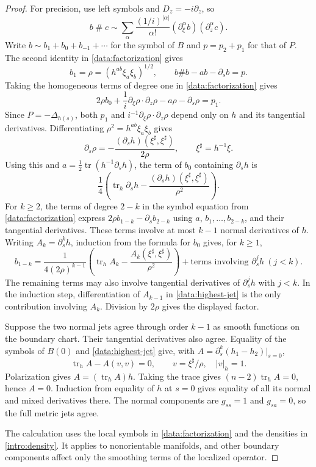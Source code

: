 \documentclass[11pt,a4paper]{article}
\theoremstyle{definition}
\theoremstyle{remark}
\DeclareMathOperator{\tr}{tr}
\numberwithin{equation}{section}
\begin{document}
\begin{proof}
For precision, use left symbols and $D_z=-i\partial_z$, so
\[
 b\mathbin{\#}c\sim
 \sum_\alpha\frac{(1/i)^{|\alpha|}}{\alpha!}
       (\partial_\xi^\alpha b)(\partial_z^\alpha c).
\]
Write $b\sim b_1+b_0+b_{-1}+\cdots$ for the symbol of $B$ and
$p=p_2+p_1$ for that of $P$. The second identity in
\eqref{data:factorization} gives
\[
 b_1=\rho=(h^{ab}\xi_a\xi_b)^{1/2},\qquad
 b\#b-ab-\partial_sb=p.
\]
Taking the homogeneous terms of degree one in
\eqref{data:factorization} gives
\[
 2\rho b_0+\frac1i\partial_\xi\rho\cdot\partial_z\rho
             -a\rho-\partial_s\rho=p_1.
\]
Since $P=-\Delta_{h(s)}$, both $p_1$ and
$i^{-1}\partial_\xi\rho\cdot\partial_z\rho$ depend only on $h$ and
its tangential derivatives. Differentiating $\rho^2=h^{ab}\xi_a\xi_b$
gives
\[
 \partial_s\rho
 =-\frac{(\partial_s h)(\xi^\sharp,\xi^\sharp)}{2\rho},
 \qquad \xi^\sharp=h^{-1}\xi.
\]
Using this and $a=\tfrac12\tr(h^{-1}\partial_s h)$, the term of $b_0$
containing $\partial_s h$ is
\[
 \frac14\left(\tr_h\partial_s h
       -\frac{(\partial_s h)(\xi^\sharp,\xi^\sharp)}{\rho^2}\right).
\]
For $k\ge2$, the terms of degree $2-k$ in the symbol equation from
\eqref{data:factorization} express $2\rho b_{1-k}-\partial_s b_{2-k}$
using $a$, $b_1,\ldots,b_{2-k}$, and their tangential derivatives.
These terms involve at most $k-1$ normal derivatives of $h$.
Writing $A_k=\partial_s^k h$, induction from the formula for $b_0$
gives, for $k\ge1$,
\begin{equation}\label{data:highest-jet}
 b_{1-k}=
 \frac{1}{4(2\rho)^{k-1}}
 \left(\tr_h A_k-
        \frac{A_k(\xi^\sharp,\xi^\sharp)}{\rho^2}\right)
 +\text{terms involving }\partial_s^j h\ (j<k).
\end{equation}
The remaining terms may also involve tangential derivatives of
$\partial_s^j h$ with $j<k$.
In the induction step, differentiation of $A_{k-1}$ in
\eqref{data:highest-jet} is the only contribution involving $A_k$.
Division by $2\rho$ gives the displayed factor.

Suppose the two normal jets agree through order $k-1$ as smooth
functions on the boundary chart. Their tangential derivatives also
agree. Equality of the symbols of $B(0)$ and \eqref{data:highest-jet}
give, with $A=\partial_s^k(h_1-h_2)|_{s=0}$,
\[
 \tr_h A-A(v,v)=0,\qquad v=\xi^\sharp/\rho,\quad |v|_h=1.
\]
Polarization gives $A=(\tr_h A)h$. Taking the trace gives
$(n-2)\tr_h A=0$, hence $A=0$. Induction from equality of $h$ at
$s=0$ gives equality of all its normal and mixed derivatives there.
The normal components are $g_{ss}=1$ and $g_{sa}=0$, so the full
metric jets agree.

The calculation uses the local symbols in \eqref{data:factorization}
and the densities in \eqref{intro:density}. It applies to nonorientable
manifolds, and other boundary components affect only the smoothing
terms of the localized operator.
\end{proof}
\end{document}
